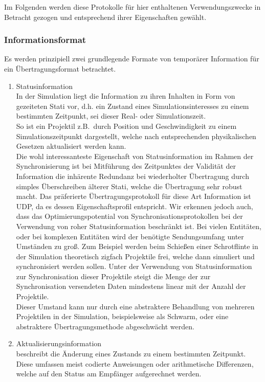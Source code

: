 \documentclass[11pt,twoside,a4paper]{article}
\begin{document}
Im Folgenden werden diese Protokolle für hier enthaltenen Verwendungszwecke in Betracht gezogen und entsprechend ihrer Eigenschaften gewählt.

\subsubsection{Informationsformat}

Es werden prinzipiell zwei grundlegende Formate von temporärer Information für ein Übertragungsformat betrachtet.
\begin{enumerate}
\item Statusinformation\\
In der Simulation liegt die Information zu ihren Inhalten in Form von gezeiteten Stati vor, d.h. ein Zustand eines Simulationsinteresses zu einem bestimmten Zeitpunkt, sei dieser Real- oder Simulationszeit. \\
So ist ein Projektil z.B.~durch Position und Geschwindigkeit zu einem Simulationszeitpunkt dargestellt, welche nach entsprechenden physikalischen Gesetzen aktualisiert werden kann.\\
Die wohl interessanteste Eigenschaft von Statusinformation im Rahmen der Synchronisierung ist bei Mitführung des Zeitpunktes der Validität der Information die inhärente Redundanz bei wiederholter Übertragung durch simples Überschreiben älterer Stati, welche die Übertragung sehr robust macht.
Das präferierte Übertragungsprotokoll für diese Art Information ist UDP, da es dessen Eigenschaftsprofil entspricht.
Wir erkennen jedoch auch, dass das Optimierungspotential von Synchronisationsprotokollen bei der Verwendung von roher Statusinformation beschränkt ist. Bei vielen Entitäten, oder bei komplexen Entitäten wird der benötigte Sendungsumfang unter Umständen zu groß.
Zum Beispiel werden beim Schießen einer Schrotflinte in der Simulation theoretisch zigfach Projektile frei, welche dann simuliert und synchronisiert werden sollen.
Unter der Verwendung von Statusinformation zur Synchronisation dieser Projektile steigt die Menge der zur Synchronisation versendeten Daten mindestens linear mit der Anzahl der Projektile.\\
Dieser Umstand kann nur durch eine abstraktere Behandlung von mehreren Projektilen in der Simulation, beispielsweise als Schwarm, oder eine abstraktere Übertragungsmethode abgeschwächt werden.
\item Aktualisierungsinformation\\
beschreibt die Änderung eines Zustands zu einem bestimmten Zeitpunkt. Diese umfassen meist codierte Anweisungen oder arithmetische Differenzen, welche auf den Status am Empfänger aufgerechnet werden.\\

\end{enumerate}
\end{document}
